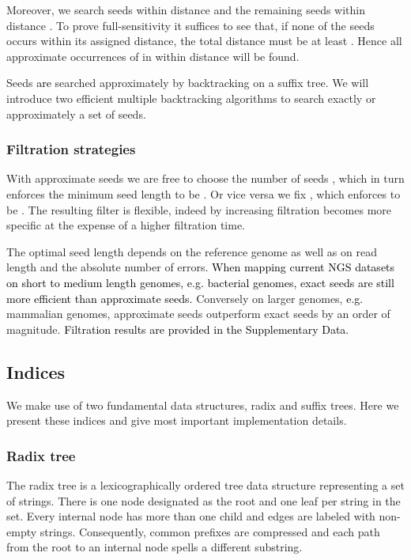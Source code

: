 \documentclass[a4,center,fleqn]{article}
\newcommand{\eg}{{e.g.}\xspace}
\begin{document}
Moreover, we search  seeds within distance  and the remaining seeds within distance .
To prove full-sensitivity it suffices to see that, if none of the seeds occurs within its assigned distance, the total distance must be at least .
Hence all approximate occurrences of  in  within distance  will be found.

Seeds \textcolor{black}{are} searched approximately by backtracking on a suffix tree.
We will introduce two efficient multiple backtracking algorithms to search exactly or approximately a set of seeds.

\subsubsection{Filtration strategies}
With approximate seeds we are free to choose the number of seeds , which in turn enforces the minimum seed length  to be .
Or vice versa we fix , which enforces  to be .
The resulting filter is flexible, indeed by increasing  filtration becomes more specific at the expense of a higher filtration time.

The optimal seed length  depends on the reference genome as well as on read length and the absolute number of errors.
\textcolor{black}{
When mapping current NGS datasets on short to medium length genomes, \eg bacterial genomes, exact seeds are still more efficient than approximate seeds.}
Conversely on larger genomes, \textcolor{black}{\eg} mammalian genomes, approximate seeds outperform exact seeds by an order of magnitude.
\textcolor{black}{Filtration results are provided in the Supplementary Data.}




\subsection{Indices}
\label{sub:Indices}

We make use of two fundamental data structures, radix and suffix trees.
Here we present these indices and give most important implementation details.

\subsubsection{Radix tree}

The radix tree \cite{Morrison1968} is a lexicographically ordered tree data structure representing a set of strings.
There is one node designated as the root and one leaf per string in the set.
Every internal node has more than one child and edges are labeled with non-empty strings.
Consequently, common prefixes are compressed and each path from the root to an internal node spells a different substring.
\end{document}
